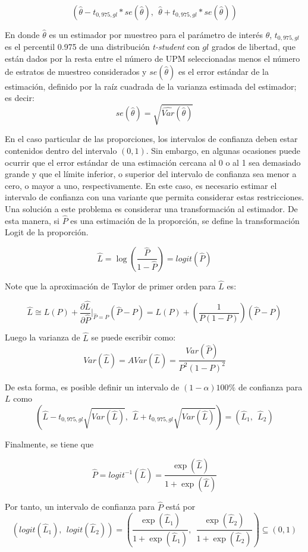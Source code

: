 \documentclass[
  12pt,
]{book}
\begin{document}
\[
(\hat\theta - t_{0,975, gl} * se(\hat\theta), \ \ \hat\theta + t_{0,975, gl} * se(\hat\theta))
\]

En donde \(\hat\theta\) es un estimador por muestreo para el parámetro de interés \(\theta\), \(t_{0,975, gl}\) es el percentil 0.975 de una distribución \emph{t-student} con \(gl\) grados de libertad, que están dados por la resta entre el número de UPM seleccionadas menos el número de estratos de muestreo considerados y \(se(\hat\theta)\) es el error estándar de la estimación, definido por la raíz cuadrada de la varianza estimada del estimador; es decir:
\[
se(\hat\theta) = \sqrt{\widehat{Var}(\hat\theta)}
\]

En el caso particular de las proporciones, los intervalos de confianza deben estar contenidos dentro del intervalo \((0, 1)\). Sin embargo, en algunas ocasiones puede ocurrir que el error estándar de una estimación cercana al 0 o al 1 sea demasiado grande y que el límite inferior, o superior del intervalo de confianza sea menor a cero, o mayor a uno, respectivamente. En este caso, es necesario estimar el intervalo de confianza con una variante que permita considerar estas restricciones. Una solución a este problema es considerar una transformación al estimador. De esta manera, si \(\hat{P}\) es una estimación de la proporción, se define la transformación Logit de la proporción.

\[
\hat{L} = \log \left(\dfrac{\hat{P}}{1-\hat{P}} \right) = logit(\hat{P})
\]

Note que la aproximación de Taylor de primer orden para \(\hat{L}\) es:

\[
\hat{L} \cong L(P) + \frac{\partial \hat{L}}{\partial \hat{P}}\biggr\rvert_{\hat{P}=P}(\hat{P}-P) = L(P) + \left( \dfrac{1}{P(1-P)}\right)(\hat{P}-P)
\]

Luego la varianza de \(\hat{L}\) se puede escribir como:
\[
Var(\hat{L}) = AVar(\hat{L}) = \dfrac{Var(\hat{P})}{P^2(1-P)^2}
\]

De esta forma, es posible definir un intervalo de \((1-\alpha)100\%\) de confianza para \(L\) como
\[
\left(\hat{L} - t_{0,975, gl}\sqrt{Var(\hat{L})}, \ \
\hat{L} + t_{0,975, gl}\sqrt{Var(\hat{L})}
\right) =
(\hat{L}_1, \ \ \hat{L}_2)
\]

Finalmente, se tiene que

\[
\hat{P} = logit^{-1}(\hat L) = \dfrac{\exp (\hat{L})}{1+\exp (\hat{L})}
\]

Por tanto, un intervalo de confianza para \(\hat{P}\) está por
\[
\left(logit(\hat{L}_1), \ \ logit(\hat{L}_2)\right) = 
\left(
\dfrac{\exp (\hat{L}_1)}{1+\exp (\hat{L}_1)}, \ \
\dfrac{\exp (\hat{L}_2)}{1+\exp (\hat{L}_2)}
\right) \subseteq (0, 1)
\]
\end{document}
